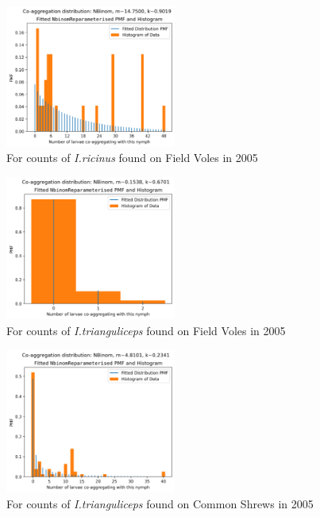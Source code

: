 \documentclass{article}
\begin{document}
\begin{figure}[H]
	\includegraphics[width=0.5\textwidth, center]{coaggregation_dist_2005_I.ricinus_FV.png}
	\caption{For counts of \textit{I.ricinus} found on Field Voles in 2005}\label{fig:distFit_2005_Iricinus_FV}
\end{figure}

\begin{figure}[H]
	\includegraphics[width=0.5\textwidth, center]{coaggregation_dist_2005_I.trianguliceps_FV.png}
	\caption{For counts of \textit{I.trianguliceps} found on Field Voles in 2005}\label{fig:distFit_2005_Itrianguliceps_FV}
\end{figure}

\begin{figure}[H]
	\includegraphics[width=0.5\textwidth, center]{coaggregation_dist_2005_I.trianguliceps_SA.png}
	\caption{For counts of \textit{I.trianguliceps} found on Common Shrews in 2005}\label{fig:distFit_2005_Itrianguliceps_SA}
\end{figure}
\end{document}
